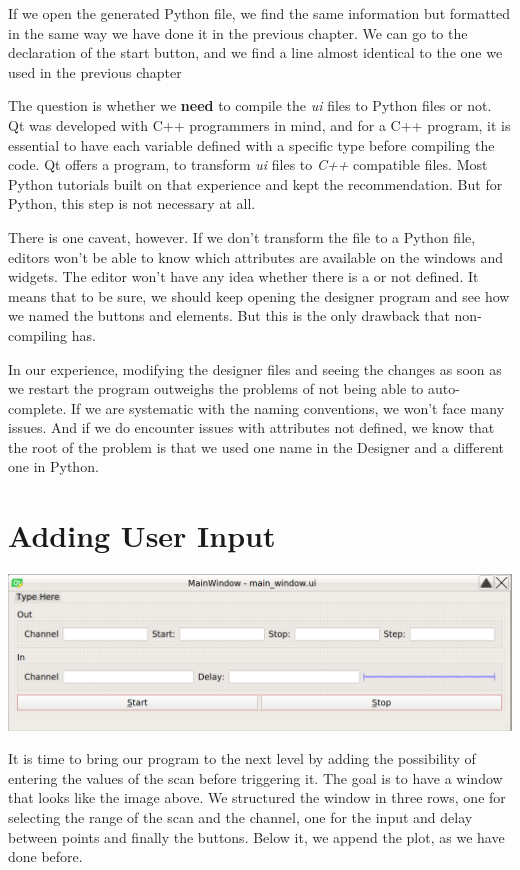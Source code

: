 If we open the generated Python file, we find the same information but formatted in the same way we have done it in the previous chapter. We can go to the declaration of the start button, and we find a line almost identical to the one we used in the previous chapter


The question is whether we \textbf{need} to compile the \emph{ui} files to Python files or not. Qt was developed with C++ programmers in mind, and for a C++ program, it is essential to have each variable defined with a specific type before compiling the code. Qt offers a program,  to transform \emph{ui} files to \emph{C++} compatible files. Most Python tutorials built on that experience and kept the recommendation. But for Python, this step is not necessary at all.

There is one caveat, however. If we don't transform the file to a Python file, editors won't be able to know which attributes are available on the windows and widgets. The editor won't have any idea whether there is a  or not defined. It means that to be sure, we should keep opening the designer program and see how we named the buttons and elements. But this is the only drawback that non-compiling has.

In our experience, modifying the designer files and seeing the changes as soon as we restart the program outweighs the problems of not being able to auto-complete. If we are systematic with the naming conventions, we won't face many issues. And if we do encounter issues with attributes not defined, we know that the root of the problem is that we used one name in the Designer and a different one in Python.

\section{Adding User Input}\label{sec:adding-user-input}
\begin{center}
    \includegraphics[width=.5\textwidth]{images/Chapter_09/08_final_window_example.png}
\end{center}

It is time to bring our program to the next level by adding the possibility of entering the values of the scan before triggering it. The goal is to have a window that looks like the image above. We structured the window in three rows, one for selecting the range of the scan and the channel, one for the input and delay between points and finally the buttons. Below it, we append the plot, as we have done before.

